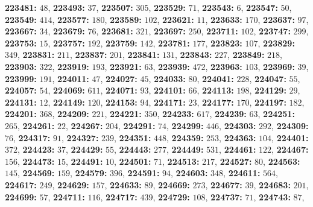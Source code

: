 \textsf{\bfseries 223481:} $48$, \textsf{\bfseries 223493:} $37$, \textsf{\bfseries 223507:} $305$, \textsf{\bfseries 223529:} $71$, \textsf{\bfseries 223543:} $6$, \textsf{\bfseries 223547:} $50$, \textsf{\bfseries 223549:} $414$, \textsf{\bfseries 223577:} $180$, \textsf{\bfseries 223589:} $102$, \textsf{\bfseries 223621:} $11$, \textsf{\bfseries 223633:} $170$, \textsf{\bfseries 223637:} $97$, \textsf{\bfseries 223667:} $34$, \textsf{\bfseries 223679:} $76$, \textsf{\bfseries 223681:} $321$, \textsf{\bfseries 223697:} $250$, \textsf{\bfseries 223711:} $102$, \textsf{\bfseries 223747:} $299$, \textsf{\bfseries 223753:} $15$, \textsf{\bfseries 223757:} $192$, \textsf{\bfseries 223759:} $142$, \textsf{\bfseries 223781:} $177$, \textsf{\bfseries 223823:} $107$, \textsf{\bfseries 223829:} $349$, \textsf{\bfseries 223831:} $211$, \textsf{\bfseries 223837:} $201$, \textsf{\bfseries 223841:} $131$, \textsf{\bfseries 223843:} $227$, \textsf{\bfseries 223849:} $218$, \textsf{\bfseries 223903:} $322$, \textsf{\bfseries 223919:} $193$, \textsf{\bfseries 223921:} $63$, \textsf{\bfseries 223939:} $472$, \textsf{\bfseries 223963:} $103$, \textsf{\bfseries 223969:} $39$, \textsf{\bfseries 223999:} $191$, \textsf{\bfseries 224011:} $47$, \textsf{\bfseries 224027:} $45$, \textsf{\bfseries 224033:} $80$, \textsf{\bfseries 224041:} $228$, \textsf{\bfseries 224047:} $55$, \textsf{\bfseries 224057:} $54$, \textsf{\bfseries 224069:} $611$, \textsf{\bfseries 224071:} $93$, \textsf{\bfseries 224101:} $66$, \textsf{\bfseries 224113:} $198$, \textsf{\bfseries 224129:} $29$, \textsf{\bfseries 224131:} $12$, \textsf{\bfseries 224149:} $120$, \textsf{\bfseries 224153:} $94$, \textsf{\bfseries 224171:} $23$, \textsf{\bfseries 224177:} $170$, \textsf{\bfseries 224197:} $182$, \textsf{\bfseries 224201:} $368$, \textsf{\bfseries 224209:} $221$, \textsf{\bfseries 224221:} $350$, \textsf{\bfseries 224233:} $617$, \textsf{\bfseries 224239:} $63$, \textsf{\bfseries 224251:} $265$, \textsf{\bfseries 224261:} $22$, \textsf{\bfseries 224267:} $204$, \textsf{\bfseries 224291:} $74$, \textsf{\bfseries 224299:} $446$, \textsf{\bfseries 224303:} $292$, \textsf{\bfseries 224309:} $76$, \textsf{\bfseries 224317:} $91$, \textsf{\bfseries 224327:} $239$, \textsf{\bfseries 224351:} $448$, \textsf{\bfseries 224359:} $253$, \textsf{\bfseries 224363:} $104$, \textsf{\bfseries 224401:} $372$, \textsf{\bfseries 224423:} $37$, \textsf{\bfseries 224429:} $55$, \textsf{\bfseries 224443:} $277$, \textsf{\bfseries 224449:} $531$, \textsf{\bfseries 224461:} $122$, \textsf{\bfseries 224467:} $156$, \textsf{\bfseries 224473:} $15$, \textsf{\bfseries 224491:} $10$, \textsf{\bfseries 224501:} $71$, \textsf{\bfseries 224513:} $217$, \textsf{\bfseries 224527:} $80$, \textsf{\bfseries 224563:} $145$, \textsf{\bfseries 224569:} $159$, \textsf{\bfseries 224579:} $396$, \textsf{\bfseries 224591:} $94$, \textsf{\bfseries 224603:} $348$, \textsf{\bfseries 224611:} $564$, \textsf{\bfseries 224617:} $249$, \textsf{\bfseries 224629:} $157$, \textsf{\bfseries 224633:} $89$, \textsf{\bfseries 224669:} $273$, \textsf{\bfseries 224677:} $39$, \textsf{\bfseries 224683:} $201$, \textsf{\bfseries 224699:} $57$, \textsf{\bfseries 224711:} $116$, \textsf{\bfseries 224717:} $439$, \textsf{\bfseries 224729:} $108$, \textsf{\bfseries 224737:} $71$, \textsf{\bfseries 224743:} $87$, 
